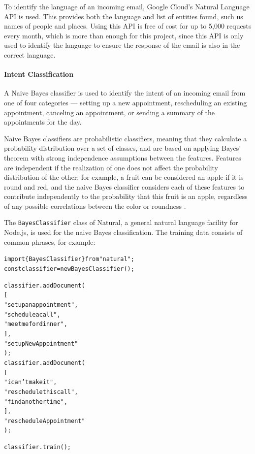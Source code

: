 \documentclass{article}
\begin{document}
To identify the language of an incoming email, Google Cloud's Natural Language API is used. This provides both the language and list of entities found, such us names of people and places. Using this API is free of cost for up to 5,000 requests every month, which is more than enough for this project, since this API is only used to identify the language to ensure the response of the email is also in the correct language.

\paragraph{Intent Classification}

A Naive Bayes classifier is used to identify the intent of an incoming email from one of four categories --- setting up a new appointment, rescheduling an existing appointment, canceling an appointment, or sending a summary of the appointments for the day.

Naive Bayes classifiers are probabilistic classifiers, meaning that they calculate a probability distribution over a set of classes, and are based on applying Bayes' theorem with strong independence assumptions between the features. Features are independent if the realization of one does not affect the probability distribution of the other; for example, a fruit can be considered an apple if it is round and red, and the naive Bayes classifier considers each of these features to contribute independently to the probability that this fruit is an apple, regardless of any possible correlations between the color or roundness \cite{noauthor_lecture_nodate}.

The \texttt{BayesClassifier} class of Natural, a general natural language facility for Node.js, is used for the naive Bayes classification. The training data consists of common phrases, for example:

\begin{alltt}
\textcolor{keyword}{import} \{ BayesClassifier \} \textcolor{keyword}{from} \textcolor{string}{"natural"};
\textcolor{keyword}{const} classifier = new \textcolor{variable}{BayesClassifier}();

classifier.\textcolor{variable}{addDocument}(
  [
    \textcolor{string}{"set up an appointment"},
    \textcolor{string}{"schedule a call"},
    \textcolor{string}{"meet me for dinner"},
  ],
  \textcolor{string}{"setupNewAppointment"}
);
classifier.\textcolor{variable}{addDocument}(
  [
    \textcolor{string}{"i can't make it"},
    \textcolor{string}{"reschedule this call"},
    \textcolor{string}{"find another time"},
  ],
  \textcolor{string}{"rescheduleAppointment"}
);

classifier.\textcolor{variable}{train}();
\end{alltt}
\end{document}
